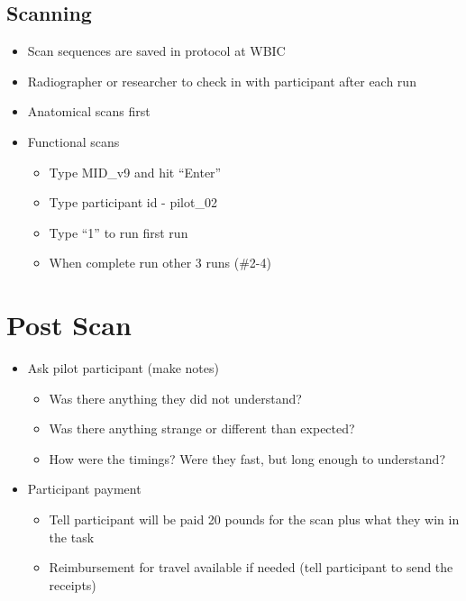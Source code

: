 \documentclass[
]{book}
\providecommand{\tightlist}{%
  \setlength{\itemsep}{0pt}\setlength{\parskip}{0pt}}
\begin{document}
\hypertarget{scanning}{%
\subsection{Scanning}\label{scanning}}

\begin{itemize}
\tightlist
\item
  Scan sequences are saved in protocol at WBIC
\item
  Radiographer or researcher to check in with participant after each run
\item
  Anatomical scans first
\item
  Functional scans

  \begin{itemize}
  \tightlist
  \item
    Type MID\_v9 and hit ``Enter''
  \item
    Type participant id - pilot\_02
  \item
    Type ``1'' to run first run
  \item
    When complete run other 3 runs (\#2-4)
  \end{itemize}
\end{itemize}

\hypertarget{post-scan}{%
\section{Post Scan}\label{post-scan}}

\begin{itemize}
\tightlist
\item
  Ask pilot participant (make notes)

  \begin{itemize}
  \tightlist
  \item
    Was there anything they did not understand?
  \item
    Was there anything strange or different than expected?
  \item
    How were the timings? Were they fast, but long enough to understand?
  \end{itemize}
\item
  Participant payment

  \begin{itemize}
  \tightlist
  \item
    Tell participant will be paid 20 pounds for the scan plus what they win in the task
  \item
    Reimbursement for travel available if needed (tell participant to send the receipts)
  \end{itemize}
\end{itemize}
\end{document}
